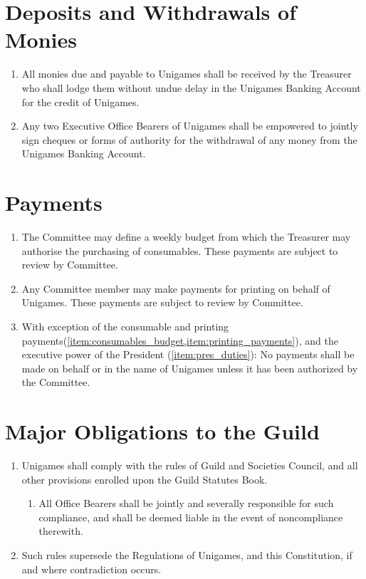 \documentclass[a4paper]{article}
\begin{document}
\section{Deposits and Withdrawals of Monies} \label{sec:monies}
\begin{enumerate}
    \item All monies due and payable to Unigames shall be received by the Treasurer who shall lodge them without undue delay in the Unigames Banking Account for the credit of Unigames.
    \item Any two Executive Office Bearers of Unigames shall be empowered to jointly sign cheques or forms of authority for the withdrawal of any money from the Unigames Banking Account.
\end{enumerate}


\section{Payments} \label{sec:payments}
\begin{enumerate}
    \item \label{item:consumables_budget}The Committee may define a weekly budget from which the Treasurer may authorise the purchasing of consumables. These payments are subject to review by Committee.
    \item \label{item:printing_payments} Any Committee member may make payments for printing on behalf of Unigames. These payments are subject to review by Committee.
    \item With exception of the consumable and printing payments(\cref{item:consumables_budget,item:printing_payments}), and the executive power of the President (\cref{item:pres_duties}): No payments shall be made on behalf or in the name of Unigames unless it has been authorized by the Committee.
\end{enumerate}


\section{Major Obligations to the Guild} \label{sec:obligations}
\begin{enumerate}
    \item Unigames shall comply with the rules of Guild and Societies Council, and all other provisions enrolled upon the Guild Statutes Book.
          \begin{enumerate}
              \item All Office Bearers shall be jointly and severally responsible for such compliance, and shall be deemed liable in the event of noncompliance therewith.
          \end{enumerate}
    \item Such rules supersede the Regulations of Unigames, and this Constitution, if and where contradiction occurs.
\end{enumerate}
\end{document}
